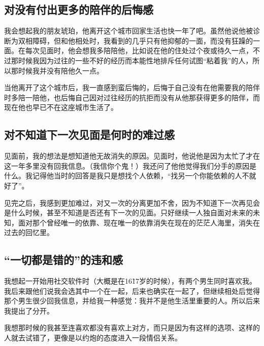 \subsection*{对没有付出更多的陪伴的后悔感}

我会想起我的朋友琥珀，他离开这个城市回家生活也快一年了吧。虽然他说他被诊断为双相障碍，但和他相处时，我看到的几乎只有他抑郁的一面，而没有狂躁的一面。在每次见面时，他会想我多陪陪他，比如说在他的住处过个夜或待久一点，不过那时候我因为过往的一些不好的经历而本能性地排斥任何试图“粘着我”的人，所以那时候我并没有陪他久一点。

当他离开了这个城市后，我一直感到蛮后悔的，后悔于自己没有在他需要我的陪伴时多陪一陪他，也后悔自己因对过往经历的抗拒而没有从他那获得更多的陪伴，而现在他也早已不在这座城市生活了。







\subsection*{对不知道下一次见面是何时的难过感}

见面前，我的想法是想知道他无故消失的原因。见面时，他说他是因为太忙了才在这一年多里没有回我信息。（我信你个鬼！）我还问了他他觉得我们分手的原因是什么。我记得他当时的回答是我只是想找个人依赖，“找另一个你能依赖的人不就好了”。

见完之后，我感到更加难过，对又一次的分离更加不舍，因为不知道下一次再见会是什么时候，甚至不知道是否还有下一次的见面。只好继续一人独自面对未来的未知，面对那个曾经唯一的依靠、现在唯一的依靠消失在现在的茫茫人海里，消失在过去的回忆里。







\subsection*{“一切都是错的”的违和感}

我想起一开始用社交软件时（大概是在16\~17岁的时候），有两个男生同时喜欢我。我后来跟他们说我会选其中一个在一起，后来也确实在一起了，但继续相处后觉得那个男生很少回我信息，并给我一种感觉：我并不是他生活里重要的人。所以后来我提出了分开。

我想那时候的我甚至连喜欢都没有喜欢上对方，而只是因为有这样的选项、这样的人就去试错了，更像是以约炮的态度进入一段情侣关系。

